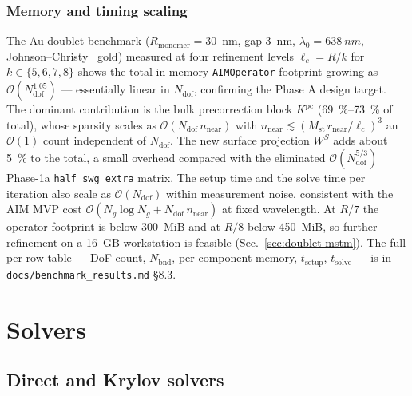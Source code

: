\documentclass[11pt,a4paper]{article}
\begin{document}
\subsubsection*{Memory and timing scaling}

The Au doublet benchmark
(\mbox{$R_{\text{monomer}} = 30$~nm}, gap \SI{3}{nm}, $\lambda_0 =
\SI{638}{nm}$, Johnson--Christy~\cite{JohnsonChristy1972} gold)
measured at four refinement levels $\ell_c = R/k$ for
$k \in \{5, 6, 7, 8\}$ shows the total in-memory \texttt{AIMOperator}
footprint growing as $\mathcal{O}(N_{\text{dof}}^{1.05})$ ---
essentially linear in $N_{\text{dof}}$, confirming the Phase A
design target.  The dominant contribution is the bulk precorrection
block $K^{\text{pc}}$ (\SIrange{69}{73}{\percent} of total), whose
sparsity scales as $\mathcal{O}(N_{\text{dof}}\,n_{\text{near}})$
with $n_{\text{near}} \lesssim (M_{\text{st}}\,r_{\text{near}}/
\ell_c)^3$ an $\mathcal{O}(1)$ count independent of
$N_{\text{dof}}$.  The new surface projection $W^{S}$ adds
about \SI{5}{\percent} to the total, a small overhead compared
with the eliminated $\mathcal{O}(N_{\text{dof}}^{5/3})$ Phase-1a
\texttt{half\_swg\_extra} matrix.  The setup time and the solve
time per iteration also scale as $\mathcal{O}(N_{\text{dof}})$
within measurement noise,
consistent with the AIM MVP cost $\mathcal{O}(N_g \log N_g +
N_{\text{dof}}\,n_{\text{near}})$ at fixed wavelength.  At $R/7$
the operator footprint is below \SI{300}{MiB} and at $R/8$ below
\SI{450}{MiB}, so further refinement on a \SI{16}{GB} workstation
is feasible (Sec.~\ref{sec:doublet-mstm}).  The full per-row table — DoF count,
$N_{\text{bnd}}$, per-component memory, $t_{\text{setup}}$,
$t_{\text{solve}}$ — is in
\texttt{docs/benchmark\_results.md} \S 8.3.

\section{Solvers}
\label{sec:solver}

\subsection{Direct and Krylov solvers}
\label{sec:direct-krylov}
\end{document}
